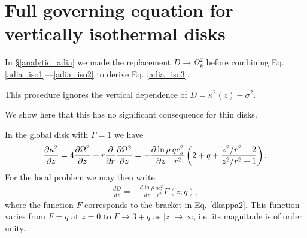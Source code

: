 \section{Full governing equation for vertically isothermal disks}\label{adia_improve}
 In \S\ref{analytic_adia} we made the replacement $D\to\Omega_k^2$
 before combining Eq. \ref{adia_iso1}---\ref{adia_iso2} to derive
 Eq. \ref{adia_iso3}. 

This procedure ignores the vertical dependence of
 $D=\kappa^2(z) - \sigma^2$. 

We show here that this has no significant
 consequence for thin disks. 

In the global disk with $\Gamma=1$ we have
\begin{align}\label{dkappa2}
  \frac{\partial\kappa^2}{\partial z} = 4 \frac{\partial\Omega^2}{\partial z} + r\frac{\partial}{\partial
    r}\frac{\partial\Omega^2}{\partial z} = -
  \frac{\partial\ln\rho}{\partial z}\frac{qc_s^2}{r^2} \left(2 + q +
    \frac{z^2/r^2-2}{z^2/r^2+1}\right). 
\end{align}
For the local problem we may then write
\begin{align}
  \frac{dD}{dz}  = - \frac{d\ln\rho}{dz}\frac{qc_s^2}{r^2}F(z;q),
\end{align}
where the function $F$ corresponds to the bracket in
Eq. \ref{dkappa2}. This function varies from $F=q$ at $z=0$ to $F\to
3+q$ as $|z|\to\infty$, i.e. its magnitude is of order unity. 

